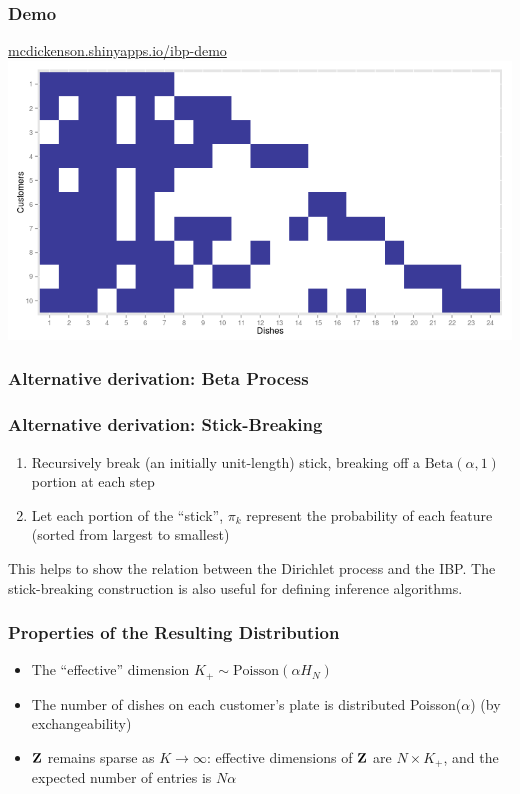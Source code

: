 \documentclass[13pt]{beamer}
\begin{document}
\begin{frame}
\frametitle{Demo}

\begin{center}
\href{http://mcdickenson.shinyapps.io/ibp-demo}{mcdickenson.shinyapps.io/ibp-demo}
\includegraphics[scale=0.4]{./img/ibp-shiny-demo.png}
\end{center}

\end{frame}
\begin{frame}
\frametitle{Alternative derivation: Beta Process}
\end{frame}
\begin{frame}
\frametitle{Alternative derivation: Stick-Breaking}

\begin{enumerate}
\item Recursively break (an initially unit-length) stick, breaking off a $\text{Beta}(\alpha, 1)$ portion at each step
\item Let each portion of the ``stick'', $\pi_k$ represent the probability of each feature (sorted from largest to smallest)
\end{enumerate}

This helps to show the relation between the Dirichlet process and the IBP. The stick-breaking construction is also useful for defining inference algorithms.

\end{frame}
\begin{frame}
\frametitle{Properties of the Resulting Distribution}
\begin{itemize}
\item The ``effective'' dimension $K_+ \sim \text{Poisson}(\alpha H_N)$
\item The number of dishes on each customer's plate is distributed Poisson($\alpha$) (by exchangeability)
\item $\bf{Z}$ remains sparse as $K\rightarrow \infty$: effective dimensions of $\bf{Z}$ are $N \times K_+$, and the expected number of entries is $N\alpha$
\end{itemize}

\end{frame}
\end{document}
